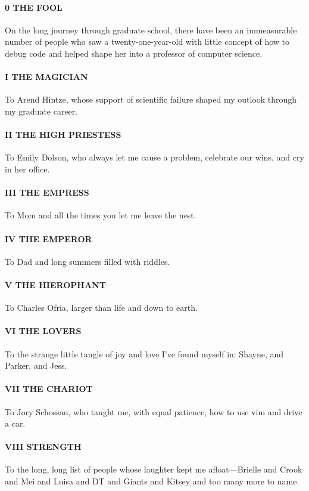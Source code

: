 \paragraph{0 THE FOOL} On the long journey through graduate school, there have been an immeasurable number of people who saw a twenty-one-year-old with little concept of how to debug code and helped shape her into a professor of computer science.

\paragraph{I THE MAGICIAN} To Arend Hintze, whose support of scientific failure shaped my outlook through my graduate career. 

\paragraph{II THE HIGH PRIESTESS} To Emily Dolson, who always let me cause a problem, celebrate our wins, and cry in her office.

\paragraph{III THE EMPRESS} To Mom and all the times you let me leave the nest.

\paragraph{IV THE EMPEROR} To Dad and long summers filled with riddles.

\paragraph{V THE HIEROPHANT} To Charles Ofria, larger than life and down to earth.

\paragraph{VI THE LOVERS} To the strange little tangle of joy and love I've found myself in: Shayne, and Parker, and Jess. 

\paragraph{VII THE CHARIOT} To Jory Schossau, who taught me, with equal patience, how to use vim and drive a car.

\paragraph{VIII STRENGTH} To the long, long list of people whose laughter kept me afloat---Brielle and Crook and Mei and Luisa and DT and Giants and Kitsey and too many more to name. 

